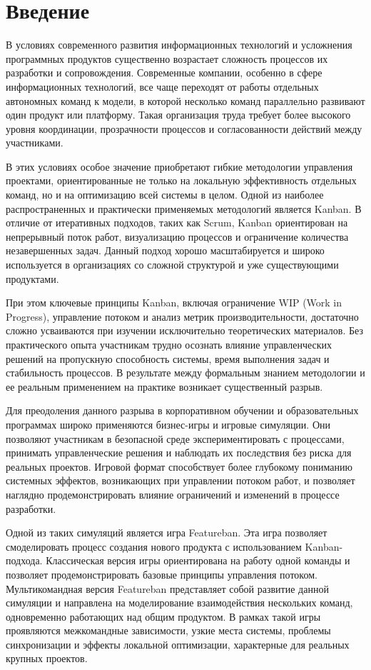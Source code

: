 \section{Введение}

В условиях современного развития информационных технологий и усложнения программных продуктов существенно возрастает сложность процессов их разработки и сопровождения. Современные компании, особенно в сфере информационных технологий, все чаще переходят от работы отдельных автономных команд к модели, в которой несколько команд параллельно развивают один продукт или платформу. Такая организация труда требует более высокого уровня координации, прозрачности процессов и согласованности действий между участниками.

В этих условиях особое значение приобретают гибкие методологии управления проектами, ориентированные не только на локальную эффективность отдельных команд, но и на оптимизацию всей системы в целом. Одной из наиболее распространенных и практически применяемых методологий является Kanban. В отличие от итеративных подходов, таких как Scrum, Kanban ориентирован на непрерывный поток работ, визуализацию процессов и ограничение количества незавершенных задач. Данный подход хорошо масштабируется и широко используется в организациях со сложной структурой и уже существующими продуктами.

При этом ключевые принципы Kanban, включая ограничение WIP (Work in Progress), управление потоком и анализ метрик производительности, достаточно сложно усваиваются при изучении исключительно теоретических материалов. Без практического опыта участникам трудно осознать влияние управленческих решений на пропускную способность системы, время выполнения задач и стабильность процессов. В результате между формальным знанием методологии и ее реальным применением на практике возникает существенный разрыв.

Для преодоления данного разрыва в корпоративном обучении и образовательных программах широко применяются бизнес-игры и игровые симуляции. Они позволяют участникам в безопасной среде экспериментировать с процессами, принимать управленческие решения и наблюдать их последствия без риска для реальных проектов. Игровой формат способствует более глубокому пониманию системных эффектов, возникающих при управлении потоком работ, и позволяет наглядно продемонстрировать влияние ограничений и изменений в процессе разработки.

Одной из таких симуляций является игра Featureban.
Эта игра позволяет смоделировать процесс создания нового продукта с использованием Kanban-подхода. Классическая версия игры ориентирована на работу одной команды и позволяет продемонстрировать базовые принципы управления потоком. Мультикомандная версия Featureban представляет собой развитие данной симуляции и направлена на моделирование взаимодействия нескольких команд, одновременно работающих над общим продуктом. В рамках такой игры проявляются межкомандные зависимости, узкие места системы, проблемы синхронизации и эффекты локальной оптимизации, характерные для реальных крупных проектов.

